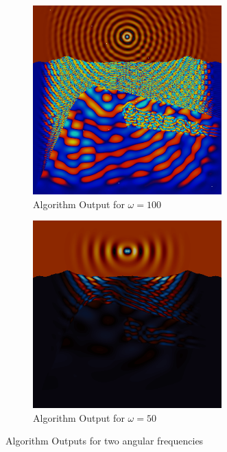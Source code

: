 \begin{figure}[ht]
	\centering
	\begin{subfigure}{0.5\textwidth}
		\centering
		\includegraphics[width=0.8\textwidth]{Images/Automated.png}
		\caption{Algorithm Output for $\omega=100$}
		\label{fig:Automation-small-omega}
	\end{subfigure}%
	\begin{subfigure}{0.5\textwidth}
		\centering
		\includegraphics[width=0.8\textwidth]{Images/Automated-Fail.png}
		\caption{Algorithm Output for $\omega=50$}
		\label{fig:Automation-large-omega}
	\end{subfigure}
	\caption{Algorithm Outputs for two angular frequencies}
	\label{fig:Automation-Success-Failure}
\end{figure}

